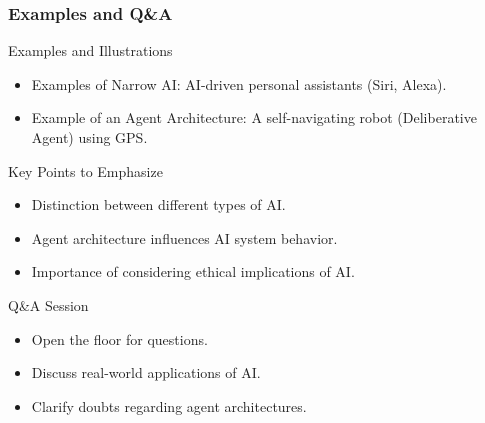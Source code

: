 \documentclass[aspectratio=169]{beamer}
\begin{document}
\begin{frame}[fragile]
    \frametitle{Examples and Q\&A}
    \begin{block}{Examples and Illustrations}
        \begin{itemize}
            \item Examples of Narrow AI: AI-driven personal assistants (Siri, Alexa).
            \item Example of an Agent Architecture: A self-navigating robot (Deliberative Agent) using GPS.
        \end{itemize}
    \end{block}

    \begin{block}{Key Points to Emphasize}
        \begin{itemize}
            \item Distinction between different types of AI.
            \item Agent architecture influences AI system behavior.
            \item Importance of considering ethical implications of AI.
        \end{itemize}
    \end{block}

    \begin{block}{Q\&A Session}
        \begin{itemize}
            \item Open the floor for questions.
            \item Discuss real-world applications of AI.
            \item Clarify doubts regarding agent architectures.
        \end{itemize}
    \end{block}
\end{frame}
\end{document}
